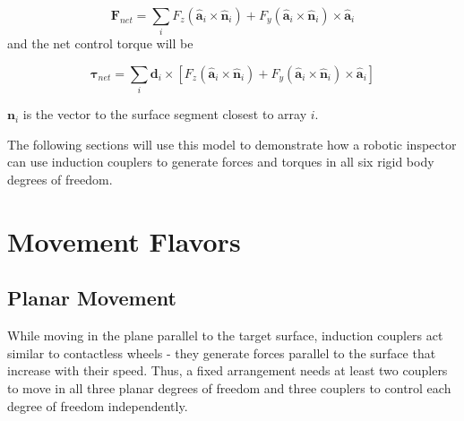 \documentclass[letterpaper, 10 pt, conference]{ieeeconf}  %
\begin{document}
 \begin{equation}
 \label{eq:Fnet }
  \textbf{F}_{net} =  \sum_{i} F_z \left(\hat{\textbf{a}}_i \times \hat{\textbf{n}}_i \right) 
		+ F_y \left(\hat{\textbf{a}}_i \times \hat{\textbf{n}}_i \right) \times \hat{\textbf{a}}_i
 \end{equation}
 and the net control torque will be
 
 \begin{equation}
 \label{Tnet}
 \boldsymbol{\tau}_{net} =  \sum_{i} \textbf{d}_i \times [F_z \left(\hat{\textbf{a}}_i \times \hat{\textbf{n}}_i \right) 
		+ F_y \left(\hat{\textbf{a}}_i \times \hat{\textbf{n}}_i \right) \times \hat{\textbf{a}}_i]
 \end{equation}

 $\textbf{n}_i$ is the vector to the surface segment closest to array $i$.  
 
 The following sections will use this model to demonstrate how a robotic inspector can use induction couplers to generate forces and torques in all six rigid body degrees of freedom.

%

\section{Movement Flavors}\label{sec:movements}
\subsection{Planar Movement}\label{sec:planar_locomotion}
While moving in the plane parallel to the target surface, induction couplers act similar to contactless wheels - they generate forces parallel to the surface that increase with their speed. Thus, a fixed arrangement needs at least two couplers to move in all three planar degrees of freedom and three couplers to control each degree of freedom independently.    
% 
\end{document}

